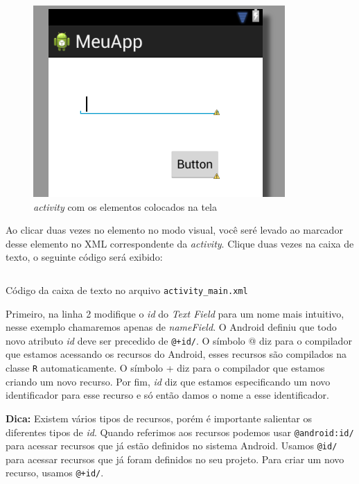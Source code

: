 \documentclass[a4paper,12pt,brazil]{book}
\begin{document}
\begin{singlespace}
\begin{figure}[H]
  \centering
  \includegraphics{figuras/4-criando-app.png}
  \caption{\emph{activity} com os elementos colocados na tela}
  \label{fig:a}
\end{figure}

Ao clicar duas vezes no elemento no modo visual, você seré levado ao marcador desse elemento no XML correspondente da \emph{activity}. Clique duas vezes na caixa de texto, o seguinte código será exibido:

\begin{listing}
\inputminted[linenos=true,fontsize=\small,frame=lines, framesep=2mm, tabsize=2,numbersep=5pt]{xml}{src/firstapp/1.xml}
\caption{Código da caixa de texto no arquivo \texttt{activity\_main.xml}}
\end{listing}

Primeiro, na linha 2 modifique o \emph{id} do \emph{Text Field} para um nome mais intuitivo, nesse exemplo chamaremos apenas de \emph{nameField}. O Android definiu que todo novo atributo \emph{id} deve ser precedido de \texttt{@+id/}. O símbolo @ diz para o compilador que estamos acessando os recursos do Android, esses recursos são compilados na classe \texttt{R} automaticamente. O símbolo + diz para o compilador que estamos criando um novo recurso. Por fim, \emph{id} diz que estamos especificando um novo identificador para esse recurso e só então damos o nome a esse identificador.

\begin{framed}
\textbf{Dica:} Existem vários tipos de recursos, porém é importante salientar os diferentes tipos de \emph{id}. Quando referimos aos recursos podemos usar \texttt{@android:id/} para acessar recursos que já estão definidos no sistema Android. Usamos \texttt{@id/} para acessar recursos que já foram definidos no seu projeto. Para criar um novo recurso, usamos \texttt{@+id/}.
\end{framed}


\end{singlespace}
\end{document}
